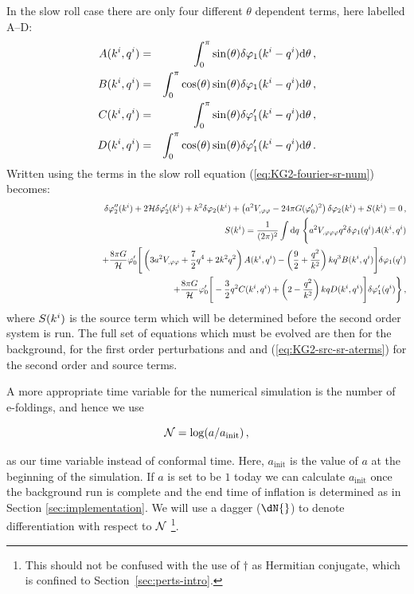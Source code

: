 In the slow roll case there are only four different $\theta$ dependent terms,
here labelled A--D:
%
\begin{eqnarray}
\label{eq:AtoD-num}
 A(k^i,q^i) &=& \int_0^\pi \sin(\theta) \delta\varphi_{1}(k^i-q^i) \mathrm{d}\theta \,,
\nonumber\\
 B(k^i,q^i) &=& \int_0^\pi \cos(\theta)\sin(\theta) \delta\varphi_{1}(k^i-q^i)
\mathrm{d}\theta \,,\nonumber\\
 C(k^i,q^i) &=& \int_0^\pi \sin(\theta) \delta\varphi_{1}'(k^i-q^i) \mathrm{d}\theta \,,
\nonumber\\
 D(k^i,q^i) &=& \int_0^\pi \cos(\theta) \sin(\theta) \delta\varphi_{1}'(k^i-q^i)
\mathrm{d}\theta \,.
\end{eqnarray}
%
Written using the terms in  the slow roll equation
(\ref{eq:KG2-fourier-sr-num}) becomes:
%
\begin{eqnarray}
\label{eq:KG2-fourier-sr-aterms}
&&\dvp2''(\kvi)+2\H\dvp2'(\kvi)+k^2\dvp2(\kvi)
+\left(a^2
\Upp-{24 \pi G}(\vp_{0}')^2\right)
\dvp2(\kvi)
+ S(\kvi) = 0 \,,\\
%
\label{eq:KG2-src-sr-aterms}
&&S(\kvi) = \frac{1}{(2\pi)^2}\int \d q\ \Bigg\{
a^2\Uppp q^2 \dvp1(\qvi) A(\kvi,\qvi) \nonumber\\
&& \qquad\qquad\qquad\qquad\qquad + \frac{8\pi G}{\H}\vp_{0}' \Bigg[ 
\left( 3a^2\Upp + \frac{7}{2}q^4 + 2k^2q^2\right) A(\kvi,\qvi)
-\left(\frac{9}{2} + \frac{q^2}{k^2}\right)kq^3 B(\kvi,\qvi)
\Bigg]\dvp1(\qvi) \nonumber\\
%
&&\qquad\qquad\qquad\qquad \qquad+ \frac{8\pi G}{\H}\vp_{0}' \Bigg[
-\frac{3}{2}q^2 C(\kvi,\qvi) + \left(2-\frac{q^2}{k^2}\right)kq D(\kvi,\qvi) 
\Bigg]\dvp1'(\qvi) \Bigg\} \,,
%
\end{eqnarray}
%
where $S(k^i)$ is the source term which will be determined before the
second order system is run. The full set of equations which must be evolved are
then  for the background,  for the first
order perturbations and  and
(\ref{eq:KG2-src-sr-aterms}) for the second order and source terms.


A more appropriate time variable for the numerical simulation is the
number of e-foldings, and hence we use 
%

\begin{equation}
\label{eq:def-ntime}
\mathcal{N} = \log ( a / a_{\mathrm{init}} )\,,
\end{equation}

%
as our time variable instead of conformal time. Here,
$a_{\mathrm{init}}$ is the value of $a$ at the beginning of the
simulation. If $a$ is set to be $1$ today we can calculate
$a_{\mathrm{init}}$ once the background run is complete and the end
time of inflation is determined as in Section
\ref{sec:implementation}. We will use a dagger ($\dN{}$) to denote
differentiation with respect to $\mathcal{N}$ \footnote{This should not be confused
with the use of $\dagger$ as Hermitian conjugate, which is confined to
Section~\ref{sec:perts-intro}.}.


